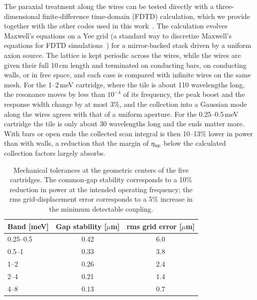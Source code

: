 \documentclass[
  aps,prl,reprint,superscriptaddress,
  amsmath,amssymb,floatfix,nofootinbib
]{revtex4-2}
\begin{document}
The paraxial treatment along the wires can be tested directly with a three-dimensional finite-difference time-domain (FDTD) calculation, which we provide together with the other codes used in this work~\cite{WiregridGitHub}. The calculation evolves Maxwell's equations on a Yee grid (a standard way to discretize Maxwell's equations for FDTD simulations~\cite{Yee:1966}) for a mirror-backed stack driven by a uniform axion source. The lattice is kept periodic across the wires, while the wires are given their full 10\,cm length and terminated on conducting bars, on conducting walls, or in free space, and each case is compared with infinite wires on the same mesh. For the 1--2\,meV cartridge, where the tile is about 110 wavelengths long, the resonance moves by less than $10^{-4}$ of its frequency, the peak boost and the response width change by at most 3\%, and the collection into a Gaussian mode along the wires agrees with that of a uniform aperture. For the 0.25--0.5\,meV cartridge the tile is only about 30 wavelengths long and the ends matter more. With bars or open ends the collected scan integral is then 10--13\% lower in power than with walls, a reduction that the margin of $\eta_{\rm ap}$ below the calculated collection factors largely absorbs. 

\begin{table}[b]
\caption{Mechanical tolerances at the geometric centers of the five cartridges. The common-gap stability corresponds to a 10\% reduction in power at the intended operating frequency; the rms grid-displacement error corresponds to a 5\% increase in the minimum detectable coupling.}
\label{tab:tolerances}
\begin{ruledtabular}
\begin{tabular}{lcc}
Band [meV] & \shortstack{Gap stability\\{[$\mu$m]}} & \shortstack{rms grid error\\{[$\mu$m]}}\\
\hline
0.25--0.5 & 0.42 & 6.0\\
0.5--1 & 0.33 & 3.8\\
1--2 & 0.26 & 2.4\\
2--4 & 0.21 & 1.4\\
4--8 & 0.13 & 0.7\\
\end{tabular}
\end{ruledtabular}
\end{table}
\end{document}
